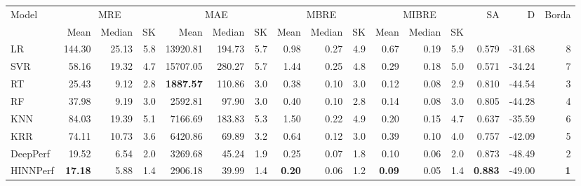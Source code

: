 \begin{tabular}{lrrrrrrrrrrrrrrr}
\toprule
Model & \multicolumn{3}{c}{MRE} & \multicolumn{3}{c}{MAE} & \multicolumn{3}{c}{MBRE} & \multicolumn{3}{c}{MIBRE} & SA & D & Borda \\
 & Mean & Median & SK & Mean & Median & SK & Mean & Median & SK & Mean & Median & SK &  &  &  \\
\midrule
LR & 144.30 & 25.13 & 5.8 & 13920.81 & 194.73 & 5.7 & 0.98 & 0.27 & 4.9 & 0.67 & 0.19 & 5.9 & 0.579 & -31.68 & 8 \\
SVR & 58.16 & 19.32 & 4.7 & 15707.05 & 280.27 & 5.7 & 1.44 & 0.25 & 4.8 & 0.29 & 0.18 & 5.0 & 0.571 & -34.24 & 7 \\
RT & 25.43 & 9.12 & 2.8 & \textbf{1887.57} & 110.86 & 3.0 & 0.38 & 0.10 & 3.0 & 0.12 & 0.08 & 2.9 & 0.810 & -44.54 & 3 \\
RF & 37.98 & 9.19 & 3.0 & 2592.81 & 97.90 & 3.0 & 0.40 & 0.10 & 2.8 & 0.14 & 0.08 & 3.0 & 0.805 & -44.28 & 4 \\
KNN & 84.03 & 19.39 & 5.1 & 7166.69 & 183.83 & 5.3 & 1.50 & 0.22 & 4.9 & 0.20 & 0.15 & 4.7 & 0.637 & -35.59 & 6 \\
KRR & 74.11 & 10.73 & 3.6 & 6420.86 & 69.89 & 3.2 & 0.64 & 0.12 & 3.0 & 0.39 & 0.10 & 4.0 & 0.757 & -42.09 & 5 \\
DeepPerf & 19.52 & 6.54 & 2.0 & 3269.68 & 45.24 & 1.9 & 0.25 & 0.07 & 1.8 & 0.10 & 0.06 & 2.0 & 0.873 & -48.49 & 2 \\
HINNPerf & \textbf{17.18} & 5.88 & 1.4 & 2906.18 & 39.99 & 1.4 & \textbf{0.20} & 0.06 & 1.2 & \textbf{0.09} & 0.05 & 1.4 & \textbf{0.883} & -49.00 & \textbf{1} \\
\bottomrule
\end{tabular}
